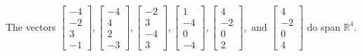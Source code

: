 \begin{exercise}
\begin{exerciseStatement}
  \end{exerciseStatement}
  \begin{exerciseAnswer}
   The vectors \(\left[\begin{array}{r}
-4 \\
-2 \\
3 \\
-1
\end{array}\right] , \left[\begin{array}{r}
-4 \\
4 \\
2 \\
-3
\end{array}\right] , \left[\begin{array}{r}
-2 \\
3 \\
-4 \\
3
\end{array}\right] , \left[\begin{array}{r}
1 \\
-4 \\
0 \\
-4
\end{array}\right] , \left[\begin{array}{r}
4 \\
-2 \\
0 \\
2
\end{array}\right] , \text{ and } \left[\begin{array}{r}
4 \\
-2 \\
0 \\
4
\end{array}\right]\) 
  	 do  
	span \(\mathbb{R}^4\).
  


  \end{exerciseAnswer}
\end{exercise}